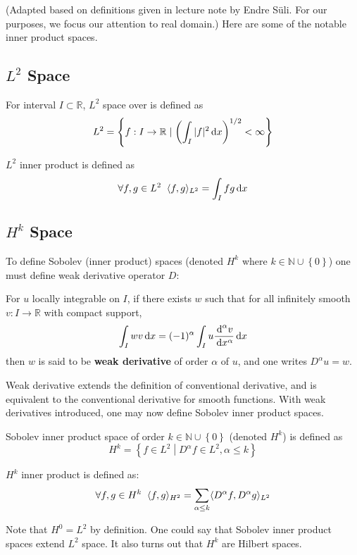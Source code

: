 \documentclass[../dissertation.tex]{subfiles}
\begin{document}
(Adapted based on definitions given in lecture note by Endre S\"uli\cite{nspde}.
For our purposes, we focus our attention to real domain.)
Here are some of the notable inner product spaces.
\subsection{$L^2$ Space}
\begin{definition}[$L^2$ Space]
    For interval $I \subset \mathbb{R}$,
    $L^2$ space over is defined as
    \begin{equation}
        L^2 = \left\{ f:I \rightarrow \mathbb{R} \left.\middle|\right. \left( \int_{I} |f|^2 \, \text{d} x \right)^{1/2} < \infty \right\}
    \end{equation}

    $L^2$ inner product is defined as
    \begin{equation}
        \forall f,g \in L^2 \; \; \langle f, g \rangle_{L^2} = \int_I f g \, \text{d} x
    \end{equation}
\end{definition}

\subsection{$H^k$ Space}
To define Sobolev (inner product) spaces (denoted $H^k$ where $k \in \mathbb{N} \cup \left\{ 0 \right\}$)
one must define weak derivative operator $D$:
\begin{definition}
    For $u$ locally integrable on $I$, if there exists $w$ such that for all infinitely smooth $v:I \rightarrow \mathbb{R}$ with compact support,
    \begin{equation}
        \int_{I} w v \, \text{d} x = (-1)^{\alpha} \int_{I} u \frac{\, \text{d}^{\alpha} v}{\, \text{d} x^{\alpha}} \, \text{d} x
    \end{equation}
    then $w$ is said to be \textbf{weak derivative} of order $\alpha$ of $u$, and one writes $D^{\alpha}u = w$.
\end{definition}

Weak derivative extends the definition of conventional derivative, and is equivalent to the conventional derivative for smooth functions.
With weak derivatives introduced, one may now define Sobolev inner product spaces.
\begin{definition}[$H^k$ Space]
    Sobolev inner product space of order $k \in \mathbb{N} \cup \left\{ 0 \right\}$ (denoted $H^k$) is defined as
    \begin{equation}
        H^k = \left\{ f \in L^2 \left.\middle|\right. D^{\alpha} f \in L^2, \alpha \leq k \right\}
    \end{equation}

    $H^k$ inner product is defined as:
    \begin{equation}
        \forall f,g \in H^{k} \; \; \langle f, g \rangle_{H^2} = \sum_{\alpha \leq k} \langle D^\alpha f, D^\alpha g \rangle_{L^2}
    \end{equation}
\end{definition}

\begin{remark}
    Note that $H^0 = L^2$ by definition.
    One could say that Sobolev inner product spaces extend $L^2$ space.
    It also turns out that $H^k$ are Hilbert spaces.
\end{remark}
\end{document}
